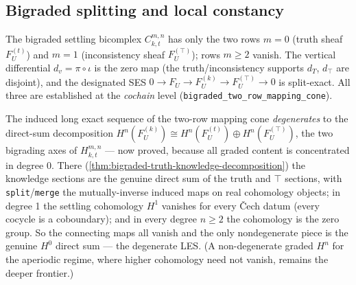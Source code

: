 \subsection{Bigraded splitting and local constancy}

\begin{theorem}\label{thm:bigraded-two-row}\leanok{}
The bigraded settling bicomplex $C^{m,n}_{k,t}$ has only the two rows $m=0$ (truth sheaf
$F_U^{(t)}$) and $m=1$ (inconsistency sheaf $F_U^{(\top)}$); rows $m\ge 2$ vanish. The vertical
differential $d_v = \pi\circ\iota$ is the zero map (the truth/inconsistency supports $d_T$,
$d_{\top}$ are disjoint), and the designated SES $0\to F_U\to F_U^{(k)}\to F_U^{(\top)}\to 0$ is
split-exact. All three are established at the \emph{cochain} level
(\texttt{bigraded\_two\_row\_mapping\_cone}).
\end{theorem}

\begin{theorem}\label{thm:bigraded-truth-knowledge-les}\leanok{}
The induced long exact sequence of the two-row mapping cone \emph{degenerates} to the direct-sum
decomposition $H^n(F_U^{(k)}) \cong H^n(F_U^{(t)}) \oplus H^n(F_U^{(\top)})$, the two bigrading axes
of $H^{m,n}_{k,t}$ --- now proved, because all graded content is concentrated in degree 0. There
(\cref{thm:bigraded-truth-knowledge-decomposition}) the knowledge sections are the genuine direct sum
of the truth and $\top$ sections, with \texttt{split}/\texttt{merge} the mutually-inverse induced
maps on real cohomology objects; in degree 1 the
settling cohomology $H^1$ vanishes for every \v{C}ech datum (every cocycle is a coboundary); and in
every degree $n\ge 2$ the cohomology is the zero group. So the connecting maps all vanish and the
only nondegenerate piece is the genuine $H^0$ direct sum --- the degenerate LES. (A non-degenerate
graded $H^n$ for the aperiodic regime, where higher cohomology need not vanish, remains the deeper
frontier.)
\end{theorem}

